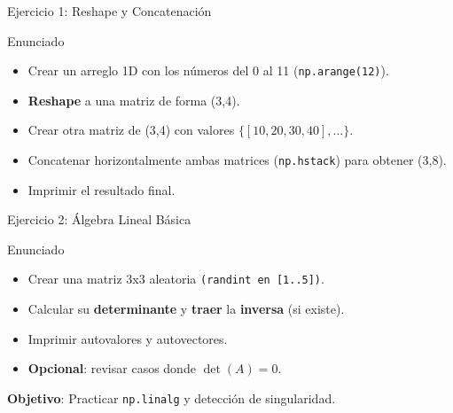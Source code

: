 \documentclass[10pt]{beamer}
\begin{document}
\begin{frame}{Ejercicio 1: Reshape y Concatenación}
  \begin{block}{Enunciado}
    \begin{itemize}
      \item Crear un arreglo 1D con los números del 0 al 11 (\texttt{np.arange(12)}).
      \item \textbf{Reshape} a una matriz de forma (3,4).
      \item Crear otra matriz de (3,4) con valores \(\{[10,20,30,40],...\}\).
      \item Concatenar horizontalmente ambas matrices (\texttt{np.hstack}) para obtener (3,8).
      \item Imprimir el resultado final.
    \end{itemize}
  \end{block}
\end{frame}

\begin{frame}{Ejercicio 2: Álgebra Lineal Básica}
  \begin{block}{Enunciado}
    \begin{itemize}
      \item Crear una matriz 3x3 aleatoria \texttt{(randint en [1..5])}.
      \item Calcular su \textbf{determinante} y \textbf{traer} la \textbf{inversa} (si existe).
      \item Imprimir autovalores y autovectores.
      \item \textbf{Opcional}: revisar casos donde \(\det(A)=0\).
    \end{itemize}
  \end{block}
  \textbf{Objetivo}: Practicar \texttt{np.linalg} y detección de singularidad.
\end{frame}
\end{document}
